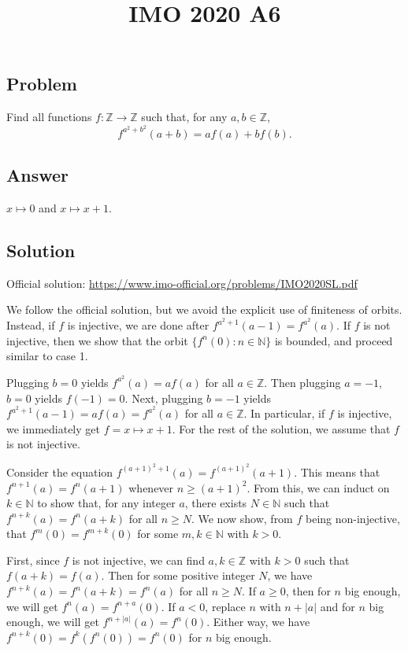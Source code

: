 \documentclass{article}
\title{IMO 2020 A6}
\author{}
\date{}
\newcommand{\N}{\mathbb{N}}
\newcommand{\Z}{\mathbb{Z}}
\begin{document}
\maketitle



\subsection*{Problem}

Find all functions $f : \Z \to \Z$ such that, for any $a, b \in \Z$,
\[ f^{a^2 + b^2}(a + b) = a f(a) + b f(b). \tag{*}\label{2020a6-eq0} \]



\subsection*{Answer}

$x \mapsto 0$ and $x \mapsto x + 1$.



\subsection*{Solution}

Official solution: \url{https://www.imo-official.org/problems/IMO2020SL.pdf}

We follow the official solution, but we avoid the explicit use of finiteness of orbits.
Instead, if $f$ is injective, we are done after $f^{a^2 + 1}(a - 1) = f^{a^2}(a)$.
If $f$ is not injective, then we show that the orbit $\{f^n(0) : n \in \N\}$ is bounded, and proceed similar to case 1.

Plugging $b = 0$ yields $f^{a^2}(a) = a f(a)$ for all $a \in \Z$.
Then plugging $a = -1$, $b = 0$ yields $f(-1) = 0$.
Next, plugging $b = -1$ yields $f^{a^2 + 1}(a - 1) = a f(a) = f^{a^2}(a)$ for all $a \in \Z$.
In particular, if $f$ is injective, we immediately get $f = x \mapsto x + 1$.
For the rest of the solution, we assume that $f$ is not injective.

Consider the equation $f^{(a + 1)^2 + 1}(a) = f^{(a + 1)^2}(a + 1)$.
This means that $f^{n + 1}(a) = f^n(a + 1)$ whenever $n \geq (a + 1)^2$.
From this, we can induct on $k \in \N$ to show that, for any integer $a$, there exists $N \in \N$ such that $f^{n + k}(a) = f^n(a + k)$ for all $n \geq N$.
We now show, from $f$ being non-injective, that $f^m(0) = f^{m + k}(0)$ for some $m, k \in \N$ with $k > 0$.

First, since $f$ is not injective, we can find $a, k \in \Z$ with $k > 0$ such that $f(a + k) = f(a)$.
Then for some positive integer $N$, we have $f^{n + k}(a) = f^n(a + k) = f^n(a)$ for all $n \geq N$.
If $a \geq 0$, then for $n$ big enough, we will get $f^n(a) = f^{n + a}(0)$.
If $a < 0$, replace $n$ with $n + |a|$ and for $n$ big enough, we will get $f^{n + |a|}(a) = f^n(0)$.
Either way, we have $f^{n + k}(0) = f^k(f^n(0)) = f^n(0)$ for $n$ big enough.
\end{document}
